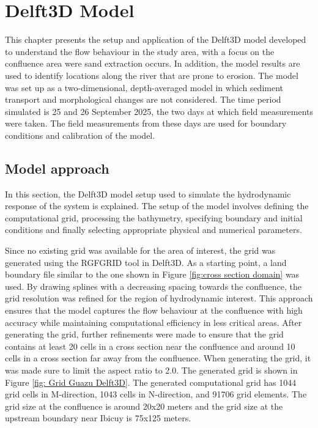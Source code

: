 \chapter{Delft3D Model}
\label{chap:Delft3DModel}
This chapter presents the setup and application of the Delft3D model developed to understand the flow behaviour in the study area, with a focus on the confluence area were sand extraction occurs. In addition, the model results are used to identify locations along the river that are prone to erosion. The model was set up as a two-dimensional, depth-averaged model in which sediment transport and morphological changes are not considered. The time period simulated is 25 and 26 September 2025, the two days at which field measurements were taken. The field measurements from these days are used for boundary conditions and calibration of the model.

\section{Model approach}
In this section, the Delft3D model setup used to simulate the hydrodynamic response of the system is explained. The setup of the model involves defining the computational grid, processing the bathymetry, specifying boundary and initial conditions and finally selecting appropriate physical and numerical parameters.

Since no existing grid was available for the area of interest, the grid was generated using the RGFGRID tool in Delft3D. As a starting point, a land boundary file similar to the one shown in Figure \ref{fig:cross section domain} was used. By drawing splines with a decreasing spacing towards the confluence, the grid resolution was refined for the region of hydrodynamic interest. This approach ensures that the model captures the flow behaviour at the confluence with high accuracy while maintaining computational efficiency in less critical areas. After generating the grid, further refinements were made to ensure that the grid contains at least 20 cells in a cross section near the confluence and around 10 cells in a cross section far away from the confluence. When generating the grid, it was made sure to limit the aspect ratio to 2.0. The generated grid is shown in Figure \ref{fig: Grid Guazu Delft3D}. The generated computational grid has 1044 grid cells in M-direction, 1043 cells in N-direction, and 91706 grid elements. The grid size at the confluence is around 20x20 meters and the grid size at the upstream boundary near Ibicuy is 75x125 meters. 

